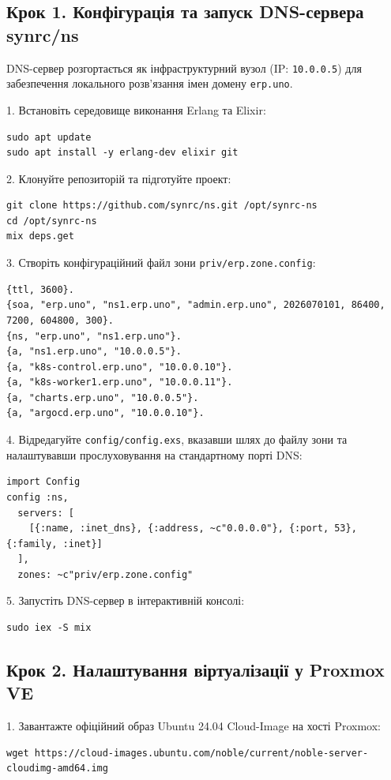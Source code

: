 \subsection{Крок 1. Конфігурація та запуск DNS-сервера synrc/ns}
DNS-сервер розгортається як інфраструктурний вузол (IP: \texttt{10.0.0.5}) для забезпечення локального розв'язання імен домену \texttt{erp.uno}.

1. Встановіть середовище виконання Erlang та Elixir:
\begin{lstlisting}
sudo apt update
sudo apt install -y erlang-dev elixir git
\end{lstlisting}

2. Клонуйте репозиторій та підготуйте проект:
\begin{lstlisting}
git clone https://github.com/synrc/ns.git /opt/synrc-ns
cd /opt/synrc-ns
mix deps.get
\end{lstlisting}

3. Створіть конфігураційний файл зони \texttt{priv/erp.zone.config}:
\begin{lstlisting}
{ttl, 3600}.
{soa, "erp.uno", "ns1.erp.uno", "admin.erp.uno", 2026070101, 86400, 7200, 604800, 300}.
{ns, "erp.uno", "ns1.erp.uno"}.
{a, "ns1.erp.uno", "10.0.0.5"}.
{a, "k8s-control.erp.uno", "10.0.0.10"}.
{a, "k8s-worker1.erp.uno", "10.0.0.11"}.
{a, "charts.erp.uno", "10.0.0.5"}.
{a, "argocd.erp.uno", "10.0.0.10"}.
\end{lstlisting}

4. Відредагуйте \texttt{config/config.exs}, вказавши шлях до файлу зони та налаштувавши прослуховування на стандартному порті DNS:
\begin{lstlisting}
import Config
config :ns,
  servers: [
    [{:name, :inet_dns}, {:address, ~c"0.0.0.0"}, {:port, 53}, {:family, :inet}]
  ],
  zones: ~c"priv/erp.zone.config"
\end{lstlisting}

5. Запустіть DNS-сервер в інтерактивній консолі:
\begin{lstlisting}
sudo iex -S mix
\end{lstlisting}

\subsection{Крок 2. Налаштування віртуалізації у Proxmox VE}
1. Завантажте офіційний образ Ubuntu 24.04 Cloud-Image на хості Proxmox:
\begin{lstlisting}
wget https://cloud-images.ubuntu.com/noble/current/noble-server-cloudimg-amd64.img
\end{lstlisting}

